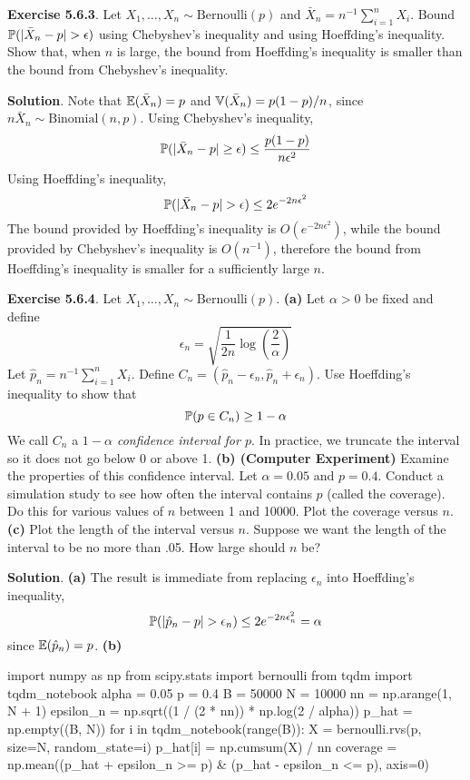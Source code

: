 \textbf{Exercise 5.6.3}. Let
\(X_{1}, \dots, X_{n} \sim \text{Bernoulli}(p)\) and
\(\bar{X}_{n} = n^{-1} \sum_{i=1}^{n} X_{i}\). Bound
\(\operatorname{\mathbb{P}}(|\bar{X}_{n} - p| > \epsilon)\) using Chebyshev's
inequality and using Hoeffding's inequality.
Show that, when \(n\) is large, the bound from Hoeffding's inequality is
smaller than the bound from Chebyshev's inequality.

\textbf{Solution}. Note that \(\operatorname{\mathbb{E}}(\bar{X}_{n}) = p\) and
\(\operatorname{\mathbb{V}}(\bar{X}_{n}) = p(1-p) / n\), since
\(n \bar{X}_{n} \sim \text{Binomial}(n, p)\).
Using Chebyshev's inequality,
\[
\operatorname{\mathbb{P}}(|\bar{X}_{n} - p| \geq \epsilon) \leq \frac{p(1 - p)}{n \epsilon^{2}}
\]
Using Hoeffding's inequality,
\[
\operatorname{\mathbb{P}}(|\bar{X}_{n} - p| > \epsilon) \leq 2e^{-2n\epsilon^{2}}
\]
The bound provided by Hoeffding's inequality is
\(O(e^{-2n\epsilon^{2}})\), while the bound provided by Chebyshev's
inequality is \(O(n^{-1})\), therefore the bound from Hoeffding's
inequality is smaller for a sufficiently large \(n\).

\textbf{Exercise 5.6.4}. Let
\(X_{1}, \dots, X_{n} \sim \text{Bernoulli}(p)\).
\textbf{(a)} Let \(\alpha > 0\) be fixed and define
\[
\epsilon_{n} = \sqrt{\frac{1}{2n} \log \left( \frac{2}{\alpha}\right)}
\]
Let \(\hat{p}_{n} = n^{-1} \sum_{i=1}^{n} X_{i}\). Define
\(C_{n} = (\hat{p}_{n} - \epsilon_{n}, \hat{p}_{n} + \epsilon_{n})\). Use
Hoeffding's inequality to show that
\[
\operatorname{\mathbb{P}}(p \in C_{n}) \geq 1 - \alpha
\]
We call \(C_{n}\) a \emph{\(1 - \alpha\) confidence interval for \(p\)}.
In practice, we truncate the interval so it does not go below 0 or above
1.
\textbf{(b) (Computer Experiment)} Examine the properties of this
confidence interval. Let \(\alpha = 0.05\) and \(p = 0.4\). Conduct a
simulation study to see how often the interval contains \(p\) (called
the coverage). Do this for various values of \(n\) between 1 and 10000.
Plot the coverage versus \(n\).
\textbf{(c)} Plot the length of the interval versus \(n\). Suppose we
want the length of the interval to be no more than .05. How large should
\(n\) be?

\textbf{Solution}.
\textbf{(a)} The result is immediate from replacing \(\epsilon_{n}\) into
Hoeffding's inequality,
\[
\operatorname{\mathbb{P}}(|\hat{p}_{n} - p| > \epsilon_{n}) \leq 2e^{-2n\epsilon_{n}^{2}} = \alpha
\]
since \(\operatorname{\mathbb{E}}(\hat{p}_{n}) = p\).
\textbf{(b)}

\begin{python}
import numpy as np
from scipy.stats import bernoulli
from tqdm import tqdm_notebook
alpha = 0.05
p = 0.4
B = 50000
N = 10000
nn = np.arange(1, N + 1)
epsilon_n = np.sqrt((1 / (2 * nn)) * np.log(2 / alpha))
p_hat = np.empty((B, N))
for i in tqdm_notebook(range(B)):
    X = bernoulli.rvs(p, size=N, random_state=i)
    p_hat[i] = np.cumsum(X) / nn
coverage = np.mean((p_hat + epsilon_n >= p) & (p_hat - epsilon_n <= p), axis=0)
\end{python}

